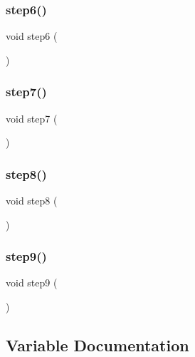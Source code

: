 \subsubsection{\texorpdfstring{step6()}{step6()}}
{\footnotesize\ttfamily void step6 (\begin{DoxyParamCaption}{ }\end{DoxyParamCaption})}

\mbox{\label{alphabet2_8_c_ab8e6c007fd00864128c789dcbb7431d6}} 
\subsubsection{\texorpdfstring{step7()}{step7()}}
{\footnotesize\ttfamily void step7 (\begin{DoxyParamCaption}{ }\end{DoxyParamCaption})}

\mbox{\label{alphabet2_8_c_ac956094a7e2e4c7381a221557cb3c820}} 
\subsubsection{\texorpdfstring{step8()}{step8()}}
{\footnotesize\ttfamily void step8 (\begin{DoxyParamCaption}{ }\end{DoxyParamCaption})}

\mbox{\label{alphabet2_8_c_a23e5e69193b86fbfe05b8fad607861d8}} 
\subsubsection{\texorpdfstring{step9()}{step9()}}
{\footnotesize\ttfamily void step9 (\begin{DoxyParamCaption}{ }\end{DoxyParamCaption})}



\subsection{Variable Documentation}
\mbox{\label{alphabet2_8_c_a148e3876077787926724625411d6e7a9}} 

